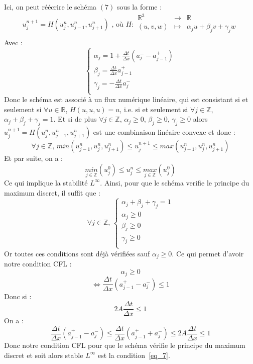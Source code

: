 \documentclass[a4paper,12pt]{article}
\begin{document}
Ici, on peut r\'e\'ecrire le sch\'ema $(7)$ sous la forme :
\[u_{j}^{n+1}=H(u_{j}^{n},u_{j-1}^{n},u_{j+1}^{n}) \text{ , o\`u }
H:\begin{array}{ccccc}
\mathbb{R}^{3} & \to & \mathbb{R}\\
(u,v,w) & \mapsto & \alpha_{j} u + \beta_{j} v + \gamma_{j} w\\
\end{array}
\]
Avec :
\[\left\{\begin{array}{ccccc}
\alpha_{j}=1+\frac{\Delta t}{\Delta x}(a_{j}^{-}-a_{j-1}^{+})\\
\beta_{j}=\frac{\Delta t}{\Delta x}a_{j-1}^{+}\\
\gamma_{j}=-\frac{\Delta t}{\Delta x}a_{j}^{-}\\
\end{array}
\right.
\]
Donc le sch\'ema est associ\'e \`a un flux num\'erique lin\'eaire, qui est consistant si et seulement si $\forall u \in \mathbb{R}$, $H(u,u,u)=u$, i.e. si et seulement si $\forall j \in \mathbb{Z}$, $\alpha_{j} + \beta_{j} + \gamma_{j} = 1$. Et si de plus $\forall j \in \mathbb{Z}$, $\alpha_{j} \geq 0$, $\beta_{j} \geq 0$, $\gamma_{j} \geq 0$ alors $u_{j}^{n+1}=H(u_{j}^{n},u_{j-1}^{n},u_{j+1}^{n})$ est une combinaison lin\'eaire convexe et donc :
\[\forall j \in \mathbb{Z} \text{, } min(u_{j-1}^{n},u_{j}^{n},u_{j+1}^{n}) \leq u_{j}^{n+1} \leq max(u_{j-1}^{n},u_{j}^{n},u_{j+1}^{n})\]
Et par suite, on a :
\[\underset{j \in \mathbb{Z}}{min}(u_{j}^{0}) \leq u_{j}^{n} \leq \underset{j \in \mathbb{Z}}{max}(u_{j}^{0})\]
Ce qui implique la stabilit\'e $L^{\infty}$.
Ainsi, pour que le sch\'ema verifie le principe du maximum discret, il suffit que :
\[
\forall j \in \mathbb{Z} \text{, }
\left\{\begin{array}{ccccc}
\alpha_{j} + \beta_{j} + \gamma_{j} = 1\\
\alpha_{j} \geq 0\\
\beta_{j} \geq 0\\
\gamma_{j} \geq 0\\
\end{array}
\right.
\]
Or toutes ces conditions sont d\'ej\`a v\'erifi\'ees sauf $\alpha_{j} \geq 0$. Ce qui permet d'avoir notre condition CFL :
\[\alpha_{j} \geq 0\]
\[\iff \frac{\Delta t}{\Delta x}(a_{j-1}^{+}-a_{j}^{-}) \leq 1\]
Donc si :
\[2A\frac{\Delta t}{\Delta x} \leq 1\]
On a :
\[\frac{\Delta t}{\Delta x}(a_{j-1}^{+}-a_{j}^{-}) \leq \frac{\Delta t}{\Delta x}(a_{j-1}^{+}+a_{j}^{-}) \leq 2A\frac{\Delta t}{\Delta x} \leq 1\]
Donc notre condition CFL pour que le sch\'ema v\'erifie le principe du maximum discret et soit alors stable $L^{\infty}$ est la condition~\eqref{eq_7}.
\end{document}
